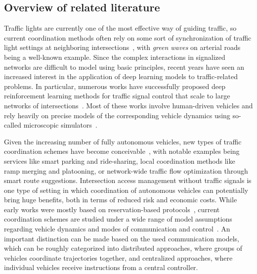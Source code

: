 \documentclass{article}
\theoremstyle{definition}
\theoremstyle{plain}
\begin{document}
\subsection{Overview of related literature}

Traffic lights are currently one of the most effective way of guiding traffic,
so current coordination methods often rely on some sort of synchronization of
traffic light settings at neighboring intersections~\cite{mcshaneTrafficEngineering1990,hePAMSCODPlatoonbasedArterial2012}, with \textit{green waves} on
arterial roads being a well-known example. Since the complex interactions in
signalized networks are difficult to model using basic principles, recent years
have seen an increased interest in the application of deep learning models to
traffic-related problems. In particular, numerous works have successfully
proposed deep reinforcement learning methods for traffic signal control that
scale to large networks of intersections~\cite{noaeenReinforcementLearningUrban2022,weiSurveyTrafficSignal2020}.
%
Most of these works involve human-driven vehicles and rely heavily on precise
models of the corresponding vehicle dynamics using so-called microscopic
simulators~\cite{lopezMicroscopicTrafficSimulation2018}.

Given the increasing number of fully autonomous vehicles, new types of traffic
coordination schemes have become conceivable~\cite{marianiCoordinationAutonomousVehicles2022}, with notable examples being
services like smart parking and ride-sharing, local coordination methods like
ramp merging and platooning, or network-wide traffic flow optimization through
smart route suggestions.
%
Intersection access management without traffic signals is one type of setting in
which coordination of autonomous vehicles can potentially bring huge benefits,
both in terms of reduced risk and economic costs. While early works were mostly
based on reservation-based protocols~\cite{dresnerMultiagentApproachAutonomous2008}, current coordination schemes are
studied under a wide range of model assumptions regarding vehicle dynamics and
modes of communication and control~\cite{khayatianSurveyIntersectionManagement2020}. An important distinction can be made
based on the used communication models, which can be roughly categorized into
distributed approaches, where groups of vehicles coordinate trajectories
together, and centralized approaches, where individual vehicles receive
instructions from a central controller.
\end{document}
